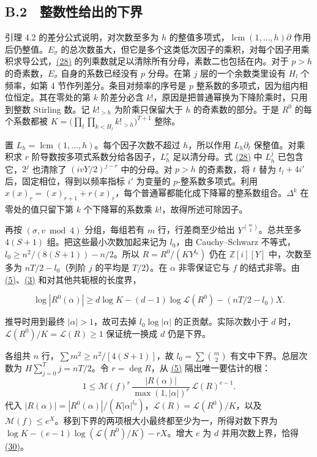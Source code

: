 \documentclass[11pt,a4paper]{article}
\begin{document}
\subsection{B.2　整数性给出的下界}\label{b.2-ux6574ux6570ux6027ux7ed9ux51faux7684ux4e0bux754c}

引理 4.2 的差分公式说明，对次数至多为 \(h\) 的整值多项式，\(\operatorname{lcm}(1,\ldots,h)\partial\) 作用后仍整值。\(E_\sigma\) 的总次数虽大，但它是多个这类低次因子的乘积，对每个因子用乘积求导公式，\hyperref[eq:28]{(28)} 的列乘数就足以清除所有分母，素数二也包括在内。对于 \(p>h\) 的奇素数，\(E_\sigma\) 自身的系数已经没有 \(p\) 分母。在第 \(j\) 层的一个余数类里设有 \(H_l\) 个频率，如第 4 节作列差分。条目对频率的序号是 \(p\) 整系数的多项式，因为组内相位恒定。其在零处的第 \(k\) 阶差分必含 \(k!\)，原因是把普通幂换为下降阶乘时，只用到整数 Stirling 数。记 \(k!_{>h}\) 为阶乘只保留大于 \(h\) 的奇素数的部分。于是 \(R^0\) 的每个系数都被 \(K=\big(\prod_l\prod_{k<H_l}k!_{>h}\big)^{T+1}\) 整除。

置 \(L_h=\operatorname{lcm}(1,\ldots,h)\)。每个因子次数不超过 \(h\)，所以作用 \(L_h\partial_t\) 保整值。对乘积求 \(r\) 阶导数按多项式系数分给各因子，\(L_h^r\) 足以清分母。式 \hyperref[eq:28]{(28)} 中 \(L_h^j\) 已包含它，\(2^j\) 也清除了 \((ivY/2)^{j-r}\) 中的分母。对 \(p>h\) 的奇素数，将 \(t\) 替为 \(t_l+4i'\) 后，固定相位，得到以频率指标 \(i'\) 为变量的 \(p\)-整系数多项式。利用 \(x(x)_{\underline r}=(x)_{\underline{r+1}}+r(x)_{\underline r}\)，每个普通幂都能化成下降幂的整系数组合。\(\Delta^k\) 在零处的值只留下第 \(k\) 个下降幂的系数乘 \(k!\)，故得所述可除因子。

再按 \((\sigma,v\bmod4)\) 分组，每组若有 \(m\) 行，行差商至少给出 \(Y^{\binom m2}\)。总共至多 \(4(S+1)\) 组。把这些最小次数加起来记为 \(l_0\)，由 Cauchy--Schwarz 不等式，\(l_0\ge n^2/(8(S+1))-n/2\)。所以 \(R=R^0/(KY^{l_0})\) 仍在 \(\mathbb Z[i][Y]\) 中，次数至多为 \(nT/2-l_0\)（列阶 \(j\) 的平均是 \(T/2\)）。在 \(\alpha\) 非零保证它与 \(f\) 的结式非零。由 \hyperref[eq:5]{(5)}、\hyperref[eq:3]{(3)} 和对其他共轭根的长度界，

\[
 \log|R^0(\alpha)|\ge
 d\log K-(d-1)\log\mathcal L(R^0)-(nT/2-l_0)X .                          \tag{30}\label{eq:30}
\]

推导时用到最终 \(|\alpha|>1\)，故可去掉 \(l_0\log|\alpha|\) 的正贡献。实际次数小于 \(d\) 时，\(\mathcal L(R^0)/K=\mathcal L(R)\ge1\) 保证统一换成 \(d\) 仍是下界。

各组共 \(n\) 行，\(\sum m^2\ge n^2/[4(S+1)]\)，故 \(l_0=\sum\binom m2\) 有文中下界。总层次数为 \(H\sum_{j=0}^Tj=nT/2\)。令 \(r=\deg R\)，从 \hyperref[eq:5]{(5)} 隔出唯一要估计的根： \[
 1\le\mathcal M(f)^r\,\frac{|R(\alpha)|}{\max(1,|\alpha|)^r}\,\mathcal L(R)^{e-1}.
\] 代入 \(|R(\alpha)|=|R^0(\alpha)|/(K|\alpha|^{l_0})\)，\(\mathcal L(R)=\mathcal L(R^0)/K\)，以及 \(\mathcal M(f)\le e^X\)。移到下界的两项根大小最终都至少为一，所得对数下界为 \(\log K-(e-1)\log(\mathcal L(R^0)/K)-rX\)。增大 \(e\) 为 \(d\) 并用次数上界，恰得 \hyperref[eq:30]{(30)}。
\end{document}
